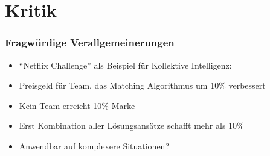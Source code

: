 \section{Kritik}
\begin{frame}
	\frametitle{Fragwürdige Verallgemeinerungen}
	\begin{itemize}
		\item
			\enquote{Netflix Challenge} als Beispiel für Kollektive Intelligenz:
		\item
			Preisgeld für Team, das Matching Algorithmus um 10\% verbessert
		\item
			Kein Team erreicht 10\% Marke
		\item
			Erst Kombination aller Lösungsansätze schafft mehr als 10\%
		\item
			Anwendbar auf komplexere Situationen?
	\end{itemize}
\end{frame}
